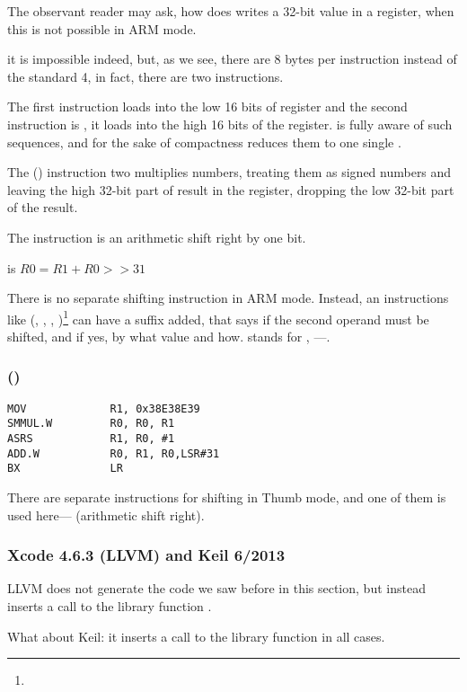 
The observant reader may ask, how does \MOV writes a 32-bit value in a register, when this is not possible in ARM mode.

it is impossible indeed, but, as we see,
there are 8 bytes per instruction instead of the standard 4,
in fact, there are two instructions.

The first instruction loads  into the low 16 bits of register and the second instruction is
, it loads  into the high 16 bits of the register.
\IDA is fully aware of such sequences, and for the sake of compactness reduces them to one single .

The  () 
instruction two multiplies numbers, treating them as signed numbers
and leaving the high 32-bit part of result in the  register,
dropping the low 32-bit part of the result.

The instruction is an arithmetic shift right by one bit.

 is $R0=R1 + R0>>31$

\label{shifts_in_ARM_mode}

There is no separate shifting instruction in ARM mode.
Instead, an instructions like 
(\MOV, \ADD, \SUB, )\footnote{\DataProcessingInstructionsFootNote}
can have a suffix added, that says if the second operand must be shifted, and if yes, by what value and how.
 stands for , ---.

\subsubsection{\OptimizingXcodeIV (\ThumbTwoMode)}

\begin{lstlisting}[style=customasmARM]
MOV             R1, 0x38E38E39
SMMUL.W         R0, R0, R1
ASRS            R1, R0, #1
ADD.W           R0, R1, R0,LSR#31
BX              LR
\end{lstlisting}


There are separate instructions for shifting in Thumb mode, 
and one of them is used here--- (arithmetic shift right).

\subsubsection{\NonOptimizing Xcode 4.6.3 (LLVM) and Keil 6/2013}

\NonOptimizing LLVM
does not generate the code we saw before in this section, but instead inserts a call to the library function 
.

What about Keil: it inserts a call to the library function  in all cases.
